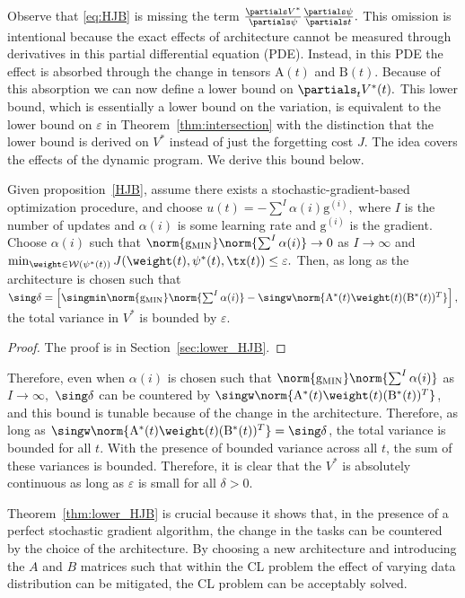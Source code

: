 Observe that \eqref{eq:HJB} is missing the term $\frac{\partials V^*}{\partials \psi}\frac{\partials \psi}{\partials t}.$ This omission is intentional because the exact effects of architecture cannot be measured through derivatives in this partial differential equation (PDE). Instead, in this PDE the effect is absorbed through the change in tensors $\mathrm{A}(t)$ and $\mathrm{B}(t)$.
Because of this absorption we can now define a lower bound on $\partials_{t} V^*(t).$ This lower bound, which is essentially a lower bound on the variation, is equivalent to the lower bound on $\varepsilon$ in Theorem~\ref{thm:intersection} with the distinction that the lower bound is derived on $V^*$ instead of just the forgetting cost $J.$ The idea covers the effects of the dynamic program. We derive this bound below.
\begin{theorem}\label{thm:lower_HJB}
Given proposition~\ref{HJB}, assume there exists a stochastic-gradient-based optimization procedure,  and choose $ u(t) =- \sum^{I} \alpha(i) \mathrm{g}^{(i)},$ where $I$ is the number of updates and $\alpha(i)$ is some learning rate and $\mathrm{g}^{(i)}$ is the gradient. Choose $\alpha(i)$ such that $\norm{\mathrm{g}_{\mathrm{MIN} }}  \norm{\sum^{I} \alpha(i) } \rightarrow 0$ as $I \rightarrow \infty$ and $\min_{\weight \in \mathcal{W}(\psi^*(t))} J(\weight(t),\psi^*(t),\tx(t)) \leq \varepsilon.$ Then, as long as the architecture is chosen such that $   \sing \delta = \left[ \singmin \norm{\mathrm{g}_{\mathrm{MIN} }}  \norm{\sum^{I} \alpha(i) } - \singw \norm{\mathrm{A}^*(t)\weight(t)( \mathrm{B}^*(t))^T} \right],$  the total variance in $V^*$ is bounded by $\varepsilon.$ 
\end{theorem}
\begin{proof}
    The proof is in Section~\ref{sec:lower_HJB}.
\end{proof}
Therefore, even when $\alpha(i)$ is chosen such that $\norm{\mathrm{g}_{\mathrm{MIN} }}  \norm{\sum^{I} \alpha(i) } $ as $I \rightarrow \infty,$ $\sing \delta$ can be countered by 
$\singw \norm{\mathrm{A}^*(t)\weight(t)( \mathrm{B}^*(t))^T}$, and this bound is tunable because of the change in the architecture. Therefore, as long as $\singw \norm{\mathrm{A}^*(t)\weight(t)( \mathrm{B}^*(t))^T} = \sing \delta$, the total variance is bounded for all $t$. With the presence of bounded variance across all $t$, the sum of these variances is bounded. Therefore, it is clear that the $V^*$ is absolutely continuous as long as $\varepsilon$ is small for all $\delta >0.$
\begin{remark}
    Theorem~\ref{thm:lower_HJB} is crucial because it shows that, in the presence of a perfect stochastic gradient algorithm, the change in the tasks can be countered by the choice of the architecture. By choosing a new architecture and introducing the $A$ and $B$ matrices such that within the CL problem the effect of varying data distribution can be mitigated,  the CL problem can be acceptably solved.
\end{remark}


